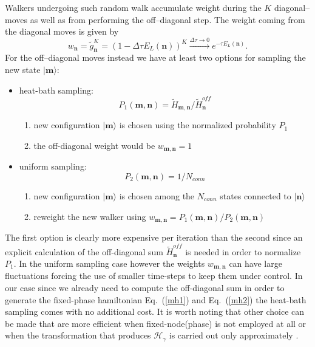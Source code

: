 Walkers undergoing such random walk accumulate weight during the $K$ diagonal--moves as well as from performing the off--diagonal step. The weight coming from the diagonal
moves is given by
\begin{equation}
w_{\mathbf{n}}=\widetilde{g}_{\mathbf{n}}^K = \left( 1-\Delta\tau E_L(\mathbf{n})\right)^K \xrightarrow{\Delta\tau \to 0} e^{-\tau E_L(\mathbf{n})}.
\end{equation}
For the off--diagonal moves instead we have at least two options for sampling the new state $\rvert \mathbf{m}\rangle$:
\begin{itemize}
 \item heat-bath sampling: 
 \begin{equation}
 \label{eq:heba}
P_1(\mathbf{m},\mathbf{n})=\widetilde{H}_{\mathbf{m},\mathbf{n}}/ \widetilde{H}^{off}_{\mathbf{n}}  
 \end{equation} 
\begin{enumerate}
 \item new configuration $\rvert \mathbf{m}\rangle$ is chosen using the normalized probability $P_1$
 \item the off-diagonal weight would be $w_{\mathbf{m},\mathbf{n}}=1$
\end{enumerate}

 \item uniform sampling: 
 \begin{equation}
P_2(\mathbf{m},\mathbf{n})=1/N_{conn}
\end{equation}
\begin{enumerate}
 \item new configuration $\rvert \mathbf{m}\rangle$ is chosen among the $N_{conn}$ states connected to $\rvert\mathbf{n}\rangle$
 \item reweight the new walker using $w_{\mathbf{m},\mathbf{n}} = P_1(\mathbf{m},\mathbf{n})/P_2(\mathbf{m},\mathbf{n})$
\end{enumerate}
\end{itemize}

The first option is clearly more expensive per iteration than the second since an explicit calculation of the off-diagonal sum $\widetilde{H}^{off}_{\mathbf{n}}$ is 
needed in order to normalize $P_1$. In the uniform sampling case however the weights $w_{\mathbf{m},\mathbf{n}}$ can have large fluctuations
forcing the use of smaller time-steps to keep them under control. In our case since we already need to compute the off-diagonal
sum in order to generate the fixed-phase hamiltonian Eq.~(\eqref{mh1}) and Eq.~(\eqref{mh2}) the heat-bath sampling comes with no additional
cost. It is worth noting that other choice can be made that are more efficient when fixed-node(phase) is not employed at all \cite{Holmes16}
or when the transformation that produces $\mathcal{H}_\gamma$ is carried out only approximately \cite{Kolodrubetz12}.

